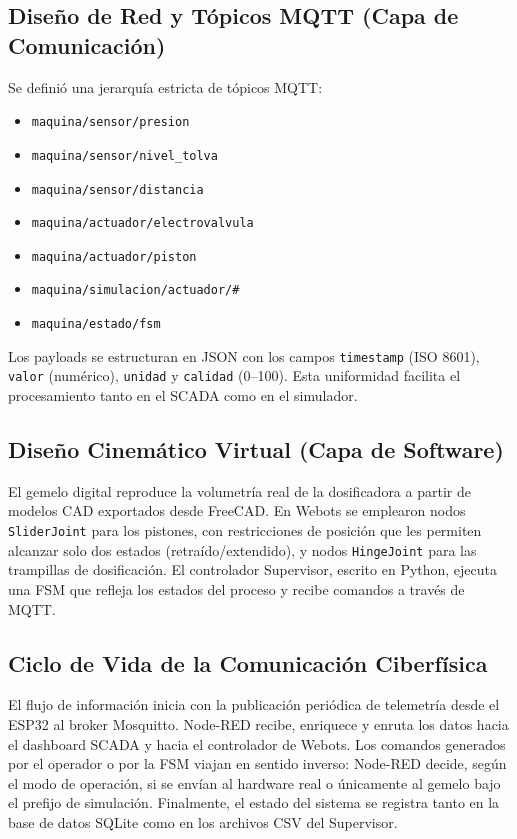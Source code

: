 \subsection{Diseño de Red y Tópicos MQTT (Capa de Comunicación)}
Se definió una jerarquía estricta de tópicos MQTT:
\begin{itemize}
    \item \texttt{maquina/sensor/presion}
    \item \texttt{maquina/sensor/nivel\_tolva}
    \item \texttt{maquina/sensor/distancia}
    \item \texttt{maquina/actuador/electrovalvula}
    \item \texttt{maquina/actuador/piston}
    \item \texttt{maquina/simulacion/actuador/\#}
    \item \texttt{maquina/estado/fsm}
\end{itemize}
Los payloads se estructuran en JSON con los campos \texttt{timestamp} (ISO 8601), \texttt{valor} (numérico), \texttt{unidad} y \texttt{calidad} (0--100). Esta uniformidad facilita el procesamiento tanto en el SCADA como en el simulador.

\subsection{Diseño Cinemático Virtual (Capa de Software)}
El gemelo digital reproduce la volumetría real de la dosificadora a partir de modelos CAD exportados desde FreeCAD. En Webots se emplearon nodos \texttt{SliderJoint} para los pistones, con restricciones de posición que les permiten alcanzar solo dos estados (retraído/extendido), y nodos \texttt{HingeJoint} para las trampillas de dosificación. El controlador Supervisor, escrito en Python, ejecuta una FSM que refleja los estados del proceso y recibe comandos a través de MQTT.

\subsection{Ciclo de Vida de la Comunicación Ciberfísica}
El flujo de información inicia con la publicación periódica de telemetría desde el ESP32 al broker Mosquitto. Node-RED recibe, enriquece y enruta los datos hacia el dashboard SCADA y hacia el controlador de Webots. Los comandos generados por el operador o por la FSM viajan en sentido inverso: Node-RED decide, según el modo de operación, si se envían al hardware real o únicamente al gemelo bajo el prefijo de simulación. Finalmente, el estado del sistema se registra tanto en la base de datos SQLite como en los archivos CSV del Supervisor.

